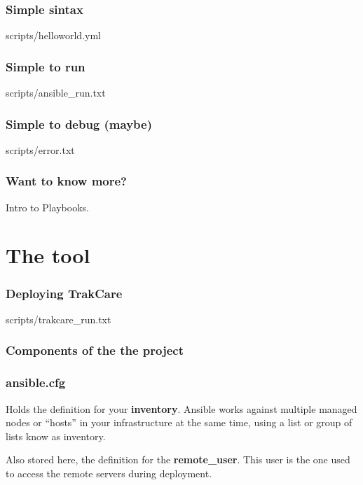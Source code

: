 \documentclass[12pt,landscape]{beamer}
\begin{document}
\begin{frame}
  \frametitle{Simple sintax}

  
{scripts/helloworld.yml}

\end{frame}        

\begin{frame}
  \frametitle{Simple to run}

  
{scripts/ansible_run.txt}

\end{frame}

\begin{frame}
  \frametitle{Simple to debug (maybe)}

  
{scripts/error.txt}

\end{frame}

\begin{frame}
  \frametitle{Want to know more?}

Intro to Playbooks\cite{intro_ansible}.

\end{frame}

\section{The tool}

\begin{frame}
  \frametitle{Deploying TrakCare}

  
{scripts/trakcare_run.txt}

\end{frame}

\begin{frame}[allowframebreaks]
  \frametitle{Components of the the project}

  

\end{frame}

\begin{frame}
  \frametitle{ansible.cfg}

Holds the definition for your \textbf{inventory}. Ansible works against multiple managed nodes or ``hosts'' in your infrastructure at the same time, using a list or group of lists know as inventory\cite{inventory_ansible}.

Also stored here, the definition for the \textbf{remote\_user}. This user is the one used to access the remote servers during deployment.

\end{frame}
\end{document}
